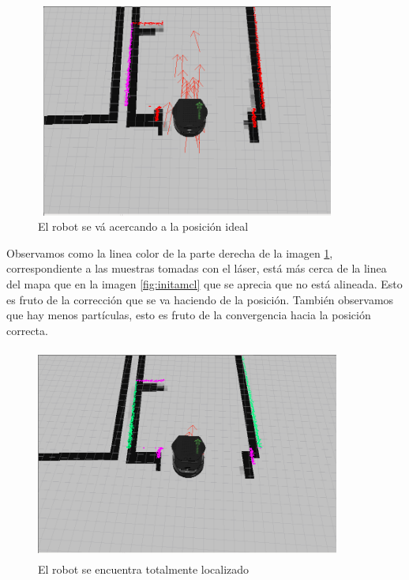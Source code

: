 \begin{figure}[hbtp]
  \begin{center}
    \includegraphics[width=10cm,height=7cm]{img/cap3/actamcl}
  \end{center}
  \caption{El robot se vá acercando a la posición ideal}
  \label{fig:actamcl}
\end{figure}

Observamos como la linea color de la parte derecha de la imagen \ref{fig:actamcl}, correspondiente a las muestras tomadas con el láser, está más cerca de la linea del mapa que en la imagen \ref{fig:initamcl} que se aprecia que no está alineada. Esto es fruto de la corrección que se va haciendo de la posición. También observamos que hay menos partículas, esto es fruto de la convergencia hacia la posición correcta.

\begin{figure}[hbtp]
  \begin{center}
    \includegraphics[width=10cm,height=7cm]{img/cap3/finamcl}
  \end{center}
  \caption{El robot se encuentra totalmente localizado}
  \label{fig:finamcl}
\end{figure}

